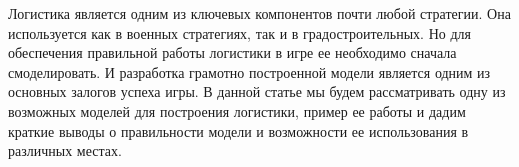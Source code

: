 
Логистика является одним из ключевых компонентов почти любой стратегии. 
Она используется как в военных стратегиях, так и в градостроительных. 
Но для обеспечения правильной работы логистики в игре ее необходимо 
сначала смоделировать. И разработка грамотно построенной модели является 
одним из основных залогов успеха игры. В данной статье мы будем рассматривать 
одну из возможных моделей для построения логистики, пример ее работы и дадим 
краткие выводы о правильности модели и возможности ее использования в различных местах.

\clearpage